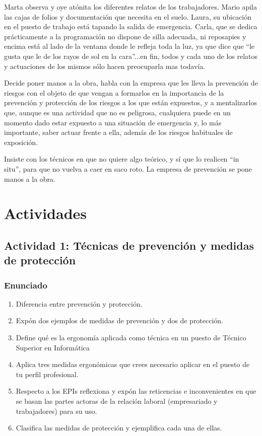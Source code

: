 Marta observa y oye atónita los diferentes relatos de los trabajadores. Mario apila las cajas de folios y documentación que necesita en el suelo. Laura, su ubicación en el puesto de trabajo está tapando la salida de emergencia. Carla, que se dedica prácticamente a la programación no dispone de silla adecuada, ni reposapies y encima está al lado de la ventana donde le refleja toda la luz, ya que dice que ``le gusta que le de los rayos de sol en la cara''...en fin, todos y cada uno de los relatos y actuaciones de los mismos sólo hacen preocuparla mas todavía.

Decide poner manos a la obra, habla con la empresa que les lleva la prevención de riesgos con el objeto de que vengan a formarlos en la importancia de la prevención y protección de los riesgos a los que están expuestos, y a mentalizarlos que, aunque es una actividad que no es peligrosa, cualquiera puede en un momento dado estar expuesto a una situación de emergencia y, lo más importante, saber actuar frente a ella, además de los riesgos habituales de exposición.

Insiste con los técnicos en que no quiere algo teórico, y sí que lo realicen ``in situ'', para que no vuelva a caer en saco roto. La empresa de prevención se pone manos a la obra.

\section{Actividades}

\subsection{Actividad 1: Técnicas de prevención y medidas de protección}

\subsubsection{Enunciado}
\begin{enumerate}[label=\alph*.]
    \item Diferencia entre prevención y protección.
    \item Expón dos ejemplos de medidas de prevención y dos de protección.
    \item Define qué es la ergonomía aplicada como técnica en un puesto de Técnico Superior en Informática
    \item Aplica tres medidas ergonómicas que crees necesario aplicar en el puesto de tu perfil profesional.
    \item Respecto a los EPIs reflexiona y expón las reticencias e inconvenientes en que se basan las partes actoras de la relación laboral (empresariado y trabajadores) para su uso.
    \item Clasifica las medidas de protección y ejemplifica cada una de ellas.
\end{enumerate}

